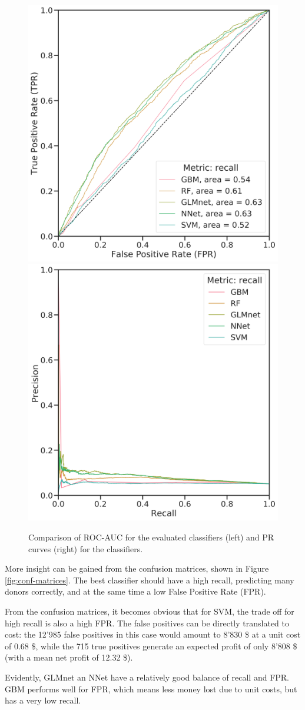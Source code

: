 \documentclass[
  11pt,
  a4paper,
  DIV=12,captions=tableheading,oneside,titlepage]{scrbook}
\begin{document}
\begin{figure}

{\centering \includegraphics[width=0.49\linewidth]{figures/learning/roc_auc_compared_refit_recall} \includegraphics[width=0.49\linewidth]{figures/learning/prec_rec_compared_refit_recall} 

}

\caption{Comparison of ROC-AUC for the evaluated classifiers (left) and PR curves (right) for the classifiers.}\label{fig:roc-auc-pr}
\end{figure}

More insight can be gained from the confusion matrices, shown in Figure \ref{fig:conf-matrices}. The best classifier should have a high recall, predicting many donors correctly, and at the same time a low False Positive Rate (FPR).

From the confusion matrices, it becomes obvious that for SVM, the trade off for high recall is also a high FPR. The false positives can be directly translated to cost: the 12'985 false positives in this case would amount to 8'830 \$ at a unit cost of 0.68 \$, while the 715 true positives generate an expected profit of only 8'808 \$ (with a mean net profit of 12.32 \$).

Evidently, GLMnet an NNet have a relatively good balance of recall and FPR. GBM performs well for FPR, which means less money lost due to unit costs, but has a very low recall.
\end{document}
